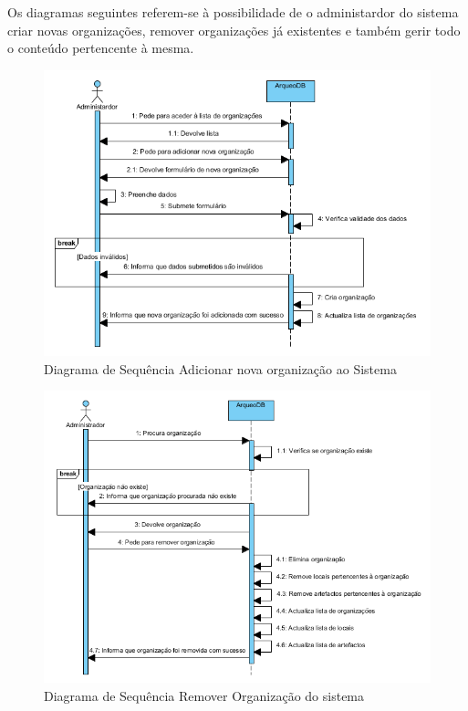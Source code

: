﻿\documentclass[12pt,a4paper]{article}
\begin{document}
\clearpage
Os diagramas seguintes referem-se à possibilidade de o administardor do sistema criar novas organizações, remover organizações já existentes e também gerir todo o conteúdo pertencente à mesma.\\

\begin{figure}[h!]
\centering
\includegraphics[scale=1]{sequencia/A_criarorganizacao}
\caption{Diagrama de Sequência Adicionar nova organização ao Sistema} 
\end{figure}  

\begin{figure}[h!]
\centering
\includegraphics[scale=1]{sequencia/A_removerorganizacao}
\caption{Diagrama de Sequência Remover Organização do sistema} 
\end{figure}  
\end{document}
